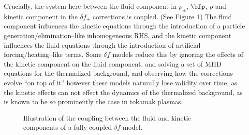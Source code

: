     Crucially, the system here between the fluid component in $\rho_{\pm}$, $\bfp$, $p$ and kinetic component in the $\delta\! f_{\pm}$ corrections is coupled. (See Figure \ref{fig:delta f coupling}) The fluid component influences the kinetic equations through the introduction of a particle generation/elimination--like inhomogeneous RHS, and the kinetic component influences the fluid equations through the introduction of artificial forcing/heating--like terms. Some $\delta\! f$ models reduce this by ignoring the effects of the kinetic component on the fluid component, and solving a set of MHD equations for the thermalized background, and observing how the corrections evolve ``on top of it''  however these models naturally lose validity over time, as the kinetic effects can not effect the dynamics of the thermalized background, as is known to be so prominently the case in tokamak plasmas.

    \begin{figure}[!ht]
        \centering
        \caption{Illustration of the coupling between the fluid and kinetic components of a fully coupled $\delta\! f$ model.}
        \label{fig:delta f coupling}
    \end{figure}



    